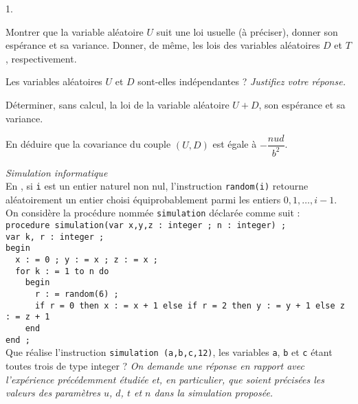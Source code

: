 \documentclass[11pt]{article}%
\begin{document}
\begin{noliste}{1.}
 \setlength{\itemsep}{4mm}
\item Montrer que la variable aléatoire $U$ suit une loi usuelle (à
préciser), donner son espérance et sa variance. Donner, de même, les
lois des
variables aléatoires $D$ et $T$, respectivement.

\item Les variables aléatoires $U$ et $D$ sont-elles indépendantes ?
\textsl{Justifiez votre réponse.}

\item Déterminer, sans calcul, la loi de la variable aléatoire $U + D$,
son espérance et sa variance.

\item En déduire que la covariance du couple $(U,D)$ est égale à
$-{\dfrac{nud}{b^{2}}}$.

\item \emph{Simulation informatique}\\
En \Scilab{}, si \texttt{i} est un entier naturel non nul,
l'instruction 
\texttt{random(i)} retourne aléatoirement un entier choisi
équiprobablement
parmi les entiers $0,1,\dots,i-1$. On considère la procédure \Scilab{}
nommée 
\texttt{simulation} déclarée comme suit : \\
\texttt{procedure simulation(var x,y,z : integer ; n : integer) ; }\\
\texttt{var k, r : integer ; }\\
\texttt{begin }\\
\texttt{\ \ x : = 0 ; y : = x ; z : = x ; }\\
\texttt{\ \ for k : = 1 to n do }\\
\texttt{\ \ \ \ begin }\\
\texttt{\ \ \ \ \ \ r : = random(6) ; }\\
\texttt{\ \ \ \ \ \ if r = 0 then x : = x + 1 else if r\TEXTsymbol{<} =
2 then y : = y + 1
else z : = z + 1 }\\
\texttt{\ \ \ \ end }\\
\texttt{end ;} \\
Que réalise l'instruction \texttt{simulation (a,b,c,12)}, les variables
\Scilab{} \texttt{a}, \texttt{b} et \texttt{c} étant toutes trois de
type
integer ? \textsl{On demande une réponse en rapport avec l'expérience
précédemment étudiée et, en particulier, que soient précisées les
valeurs des
paramètres $u$, $d$, $t$ et $n$ dans la simulation proposée.} 


\end{noliste}
\end{document}
